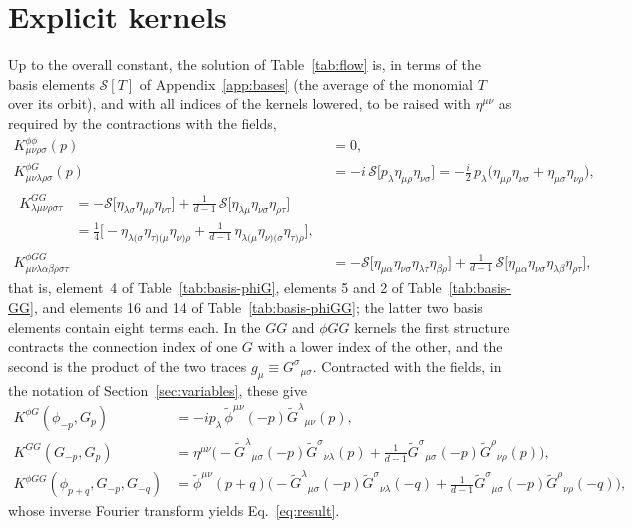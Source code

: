 \documentclass[prd,aps,preprint,nofootinbib,amsmath,amssymb,eqsecnum]{revtex4-2}
\newcommand{\p}{\tilde{\phi}}
\newcommand{\G}{\tilde{G}}
\begin{document}
\section{Explicit kernels}
\label{app:kernels}

Up to the overall constant, the solution of Table~\ref{tab:flow} is, in terms of the basis
elements $\mathcal{S}[T]$ of Appendix~\ref{app:bases} (the average of the monomial $T$ over
its orbit), and with all indices of the kernels lowered, to be raised with $\eta^{\mu\nu}$
as required by the contractions with the fields,
\begin{align}
K^{\phi\phi}_{\mu\nu\rho\sigma}(p)&=0,\\
K^{\phi G}_{\mu\nu\lambda\rho\sigma}(p)&=-i\,\mathcal{S}\big[p_\lambda\eta_{\mu\rho}\eta_{\nu\sigma}\big]
=-\tfrac{i}{2}\,p_\lambda\big(\eta_{\mu\rho}\eta_{\nu\sigma}+\eta_{\mu\sigma}\eta_{\nu\rho}\big),\\
\begin{split}
K^{GG}_{\lambda\mu\nu\rho\sigma\tau}&=
-\mathcal{S}\big[\eta_{\lambda\sigma}\eta_{\mu\rho}\eta_{\nu\tau}\big]
+\frac{1}{d-1}\,\mathcal{S}\big[\eta_{\lambda\mu}\eta_{\nu\sigma}\eta_{\rho\tau}\big]\\
&=\tfrac14\Big[-\eta_{\lambda(\sigma}\eta_{\tau)(\mu}\eta_{\nu)\rho}
+\frac{1}{d-1}\,\eta_{\lambda(\mu}\eta_{\nu)(\sigma}\eta_{\tau)\rho}\Big],
\end{split}\\
K^{\phi GG}_{\mu\nu\lambda\alpha\beta\rho\sigma\tau}&=
-\mathcal{S}\big[\eta_{\mu\alpha}\eta_{\nu\sigma}\eta_{\lambda\tau}\eta_{\beta\rho}\big]
+\frac{1}{d-1}\,\mathcal{S}\big[\eta_{\mu\alpha}\eta_{\nu\sigma}\eta_{\lambda\beta}\eta_{\rho\tau}\big],
\end{align}
that is, element~4 of Table~\ref{tab:basis-phiG}, elements 5 and 2 of
Table~\ref{tab:basis-GG}, and elements 16 and 14 of Table~\ref{tab:basis-phiGG}; the latter
two basis elements contain eight terms each. In the $GG$ and $\phi GG$ kernels the first
structure contracts the connection index of one $G$ with a lower index of the other, and the
second is the product of the two traces $g_\mu\equiv G^{\sigma}{}_{\mu\sigma}$.
Contracted with the fields, in the notation of Section~\ref{sec:variables}, these give
\begin{align}
K^{\phi G}(\phi_{-p},G_p)&=-ip_\lambda\,\p^{\mu\nu}(-p)\G^{\lambda}{}_{\mu\nu}(p),\\
K^{GG}(G_{-p},G_p)&=
\eta^{\mu\nu}\Big(-\G^{\lambda}{}_{\mu\sigma}(-p)\G^{\sigma}{}_{\nu\lambda}(p)+\frac{1}{d-1}\G^{\sigma}{}_{\mu\sigma}(-p)\G^{\rho}{}_{\nu\rho}(p)\Big),\\
K^{\phi GG}(\phi_{p+q},G_{-p},G_{-q})&=
\p^{\mu\nu}(p+q)\Big(-\G^{\lambda}{}_{\mu\sigma}(-p)\G^{\sigma}{}_{\nu\lambda}(-q)+\frac{1}{d-1}\G^{\sigma}{}_{\mu\sigma}(-p)\G^{\rho}{}_{\nu\rho}(-q)\Big),
\end{align}
whose inverse Fourier transform yields Eq.~\eqref{eq:result}.
\end{document}
